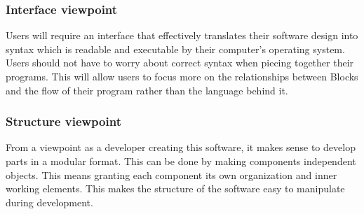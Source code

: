 \documentclass[journal,10pt,onecolumn,compsoc]{IEEEtran} \usepackage[margin=1.0in]{geometry} \usepackage{pdfpages}
\begin{document}

\subsubsection{Interface viewpoint}
\noindent Users will require an interface that effectively translates their software design into syntax which is readable and executable by their computer's operating system. 
Users should not have to worry about correct syntax when piecing together their programs. 
This will allow users to focus more on the relationships between Blocks and the flow of their program rather than the language behind it.

\subsubsection{Structure viewpoint}
\noindent From a viewpoint as a developer creating this software, it makes sense to develop parts in a modular format. 
This can be done by making components independent objects. 
This means granting each component its own organization and inner working elements.
This makes the structure of the software easy to manipulate during development.
\end{document}
